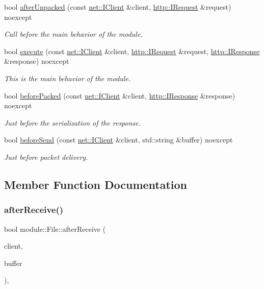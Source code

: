 \begin{DoxyCompactItemize}
bool \hyperlink{classmodule_1_1File_a201c3c9c01df460e22f270c554937639}{after\+Unpacked} (const \hyperlink{structnet_1_1IClient}{net\+::\+I\+Client} \&client, \hyperlink{structhttp_1_1IRequest}{http\+::\+I\+Request} \&request) noexcept
\begin{DoxyCompactList}\small\item\em Call before the main behavior of the module. \end{DoxyCompactList}\item 
bool \hyperlink{classmodule_1_1File_a7fceec434dd7b735e08b01a5bd16625b}{execute} (const \hyperlink{structnet_1_1IClient}{net\+::\+I\+Client} \&client, \hyperlink{structhttp_1_1IRequest}{http\+::\+I\+Request} \&request, \hyperlink{structhttp_1_1IResponse}{http\+::\+I\+Response} \&response) noexcept
\begin{DoxyCompactList}\small\item\em This is the main behavior of the module. \end{DoxyCompactList}\item 
bool \hyperlink{classmodule_1_1File_ab2004b38d5dd63e0e19f358a3820477f}{before\+Packed} (const \hyperlink{structnet_1_1IClient}{net\+::\+I\+Client} \&client, \hyperlink{structhttp_1_1IResponse}{http\+::\+I\+Response} \&response) noexcept
\begin{DoxyCompactList}\small\item\em Just before the serialization of the response. \end{DoxyCompactList}\item 
bool \hyperlink{classmodule_1_1File_a13091749fbe954576d351e90e15581d7}{before\+Send} (const \hyperlink{structnet_1_1IClient}{net\+::\+I\+Client} \&client, std\+::string \&buffer) noexcept
\begin{DoxyCompactList}\small\item\em Just before packet delivery. \end{DoxyCompactList}\end{DoxyCompactItemize}


\subsection{Member Function Documentation}
\mbox{\label{classmodule_1_1File_af37dc06c40ef291f3789ae4b00e628d7}} 
\subsubsection{\texorpdfstring{after\+Receive()}{afterReceive()}}
{\footnotesize\ttfamily bool module\+::\+File\+::after\+Receive (\begin{DoxyParamCaption}\item[{const \hyperlink{structnet_1_1IClient}{net\+::\+I\+Client} \&}]{client,  }\item[{std\+::string \&}]{buffer }\end{DoxyParamCaption})\hspace{0.3cm}{\ttfamily [virtual]}, {\ttfamily [noexcept]}}



